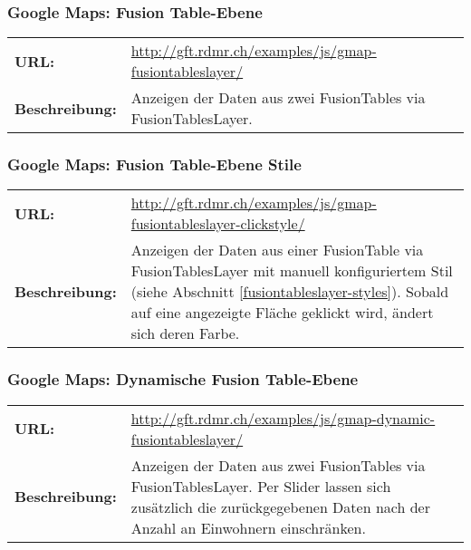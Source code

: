 \subsubsection{Google Maps: Fusion Table-Ebene}
\begin{table}[H]
\centering
\begin{tabular}{p{0.2\twocelltabwidth}p{0.8\twocelltabwidth}}
\textbf{URL:} & \url{http://gft.rdmr.ch/examples/js/gmap-fusiontableslayer/} \\ 
\textbf{Beschreibung:} & Anzeigen der Daten aus zwei FusionTables via FusionTablesLayer.  \\ 
\end{tabular} 
\end{table}

\subsubsection{Google Maps: Fusion Table-Ebene Stile}
\begin{table}[H]
\centering
\begin{tabular}{p{0.2\twocelltabwidth}p{0.8\twocelltabwidth}}
\textbf{URL:} & \url{http://gft.rdmr.ch/examples/js/gmap-fusiontableslayer-clickstyle/} \\ 
\textbf{Beschreibung:} & Anzeigen der Daten aus einer FusionTable via FusionTablesLayer mit manuell konfiguriertem Stil (siehe Abschnitt \ref{fusiontableslayer-styles}). Sobald auf eine angezeigte Fläche geklickt wird, ändert sich deren Farbe. \\ 
\end{tabular} 
\end{table}

\subsubsection{Google Maps: Dynamische Fusion Table-Ebene}
\begin{table}[H]
\centering
\begin{tabular}{p{0.2\twocelltabwidth}p{0.8\twocelltabwidth}}
\textbf{URL:} & \url{http://gft.rdmr.ch/examples/js/gmap-dynamic-fusiontableslayer/} \\ 
\textbf{Beschreibung:} & Anzeigen der Daten aus zwei FusionTables via FusionTablesLayer. Per Slider lassen sich zusätzlich die zurückgegebenen Daten nach der Anzahl an Einwohnern einschränken.  \\ 
\end{tabular} 
\end{table}

